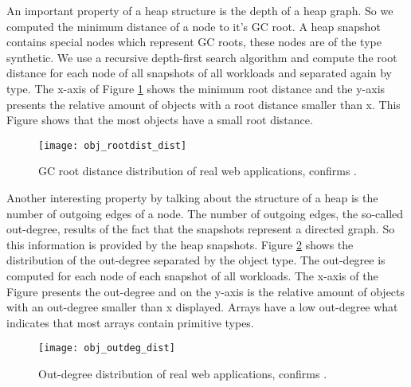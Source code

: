 An important property of a heap structure is the depth of a heap graph. So we computed the minimum distance of a node to it's GC root. A heap snapshot contains special nodes which represent GC roots, these nodes are of the type synthetic. We use a recursive depth-first search algorithm and compute the root distance for each node of all snapshots of all workloads and separated again by type. The x-axis of Figure \ref{fig:obj_rootdist_dist} shows the minimum root distance and the y-axis presents the relative amount of objects with a root distance smaller than x. This Figure shows that the most objects have a small root distance.
\begin{figure}
	\centering
	\texttt{[image: obj\_rootdist\_dist]}
	\caption{GC root distance distribution of real web applications, confirms \cite{JSMeter2009}.}
	\label{fig:obj_rootdist_dist}
\end{figure}

Another interesting property by talking about the structure of a heap is the number of outgoing edges of a node. The number of outgoing edges, the so-called out-degree, results of the fact that the snapshots represent a directed graph. So this information is provided by the heap snapshots. Figure \ref{fig:obj_outdeg_dist} shows the distribution of the out-degree separated by the object type. The out-degree is computed for each node of each snapshot of all workloads. The x-axis of the Figure presents the out-degree and on the y-axis is the relative amount of objects with an out-degree smaller than x displayed. Arrays have a low out-degree what indicates that most arrays contain primitive types. 
\begin{figure}
	\centering
	\texttt{[image: obj\_outdeg\_dist]}
	\caption{Out-degree distribution of real web applications, confirms \cite{JSMeter2009}.}
	\label{fig:obj_outdeg_dist}
\end{figure}

